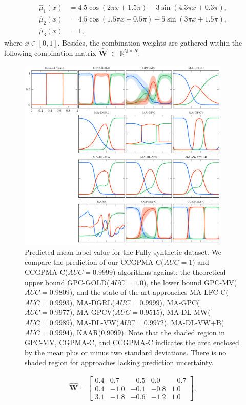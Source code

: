 \documentclass[journal]{IEEEtran}
\providecommand{\mat}[1]{{\bm{#1}}} %
\newcommand{\Real}{\mathbb{R}}
\DeclareMathOperator{\en}{\!\,\in\!\,}
\providecommand{\mat}[1]{{\mathbf{#1}}}
\begin{document}
\begin{align}
\label{eq:u1c}
\hat{\mu}_1(x) &= 4.5\cos(2\pi x + 1.5\pi) - 3\sin(4.3\pi x + 0.3\pi),\\
\label{eq:u2c}
\hat{\mu}_2(x) &= 4.5\cos(1.5\pi x + 0.5\pi) + 5\sin(3\pi x + 1.5\pi),\\
\label{eq:u3c}
\hat{\mu}_3(x) &= 1,
\end{align}
where $x\in [0,1]$. Besides, the combination weights are gathered within the following combination matrix $\hat{\mat{W}} \en \Real^{Q\times R}$:

\begin{figure}[!tb]
	\centering
% 	
	\includegraphics[width = 0.90\textwidth]{Figures/SinCla.pdf}
	\caption{Predicted mean label value for the Fully synthetic dataset. We compare the prediction of our CCGPMA-C($AUC=1$) and CCGPMA-C($AUC=0.9999$) algorithms against: the theoretical upper bound GPC-GOLD($AUC=1.0$),  the lower bound GPC-MV($AUC=0.9809$), and the state-of-the-art approaches MA-LFC-C($AUC=0.9993$), MA-DGRL($AUC=0.9999$),  MA-GPC($AUC=0.9977$), MA-GPCV($AUC=0.9515$), MA-DL-MW($AUC=0.9989$), MA-DL-VW($AUC=0.9972$), MA-DL-VW+B($AUC=0.9994$), KAAR($0.9099$). Note that the shaded region in GPC-MV, CGPMA-C, and CCGPMA-C indicates the area enclosed by the mean plus or minus two standard deviations. There is no shaded region for approaches lacking prediction uncertainty.}
	\label{fig:FSCla}
\end{figure}
\begin{align}
\hat{\mat{W}}=\begin{bmatrix}
0.4  &  0.7   & -0.5 &  0.0  & -0.7\\
0.4   &  -1.0  & -0.1  &  -0.8 & 1.0\\
3.1   &  -1.8  & -0.6  &  -1.2   & 1.0
\end{bmatrix},
\label{eq:parametersPC}
\end{align}
\end{document}
